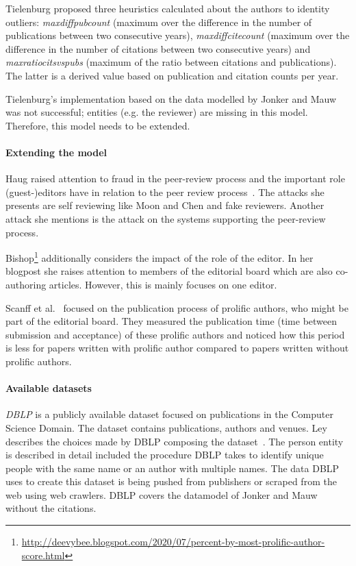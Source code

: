 \documentclass{ou-report}
\newcommand{\dblp}{DBLP}
\begin{document}
Tielenburg proposed three heuristics calculated about the authors to identity 
outliers: 
\textit{maxdiffpubcount} (maximum over the difference in the number of 
publications between two consecutive years), \textit{maxdiffcitecount} (maximum 
over the difference in the number of citations between two consecutive years) 
and \textit{maxratiocitsvspubs} (maximum of the ratio between citations and 
publications). The latter is a derived value based on publication 
and citation counts per year.

Tielenburg's implementation based on the data modelled by Jonker and Mauw was 
not successful; entities (e.g. the reviewer) are missing in this model. 
Therefore, this model needs to be extended.

\paragraph{Extending the model}
Haug raised attention to fraud in the peer-review process and the important role
(guest-)editors have in relation to the peer review process~\cite{Haug2015}. The 
attacks she presents are self reviewing like Moon and Chen and fake reviewers.
Another attack she mentions is the attack on the systems supporting the peer-review
process.

Bishop\footnote{\url{http://deevybee.blogspot.com/2020/07/percent-by-most-prolific-author-score.html}}
additionally considers the impact of the role of the editor.
In her blogpost she raises attention to members of the editorial board which are
also co-authoring articles. However, this is mainly focuses on one editor.

Scanff et al.~\cite{SNCMBL2021} focused on the publication process of prolific
authors, who might be part of the editorial board. They measured the
publication time (time between submission and acceptance) of these prolific
authors and noticed how this period is less for papers written with prolific
author compared to papers written without prolific authors. 


\paragraph{Available datasets}

\emph{\dblp{}} is a publicly available dataset focused on publications in the
Computer Science Domain. The dataset contains publications, authors and venues.
Ley describes the choices made by \dblp{} composing the
dataset~\cite{DBLP:journals/pvldb/Ley09}. The person entity is described in 
detail included the procedure DBLP takes to identify unique people with the same
name or an author with multiple names.
The data \dblp{} uses to create this dataset is being pushed from publishers or 
scraped from the web using web crawlers. \dblp{} covers the datamodel of Jonker
and Mauw without the citations.
\end{document}
